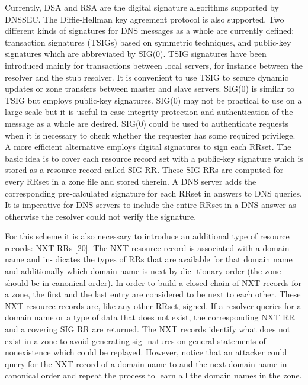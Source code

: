 \documentclass[12pt]{article}
\begin{document}
Currently, DSA and RSA are the digital signature
algorithms supported by DNSSEC. The Diffie-Hellman key
agreement protocol is also supported.
Two different kinds of signatures for DNS messages as a
whole are currently defined: transaction signatures (TSIGs) based on symmetric techniques, and public-key signatures which are abbreviated by SIG(0). TSIG signatures have been introduced mainly for transactions between
local servers, for instance between the resolver and the stub
resolver. It is convenient to use TSIG to secure dynamic
updates or zone transfers between master and slave servers.
SIG(0) is similar to TSIG but employs public-key signatures.
SIG(0) may not be practical to use on a large scale but it
is useful in case integrity protection and authentication of
the message as a whole are desired. SIG(0) could be used to
authenticate requests when it is necessary to check whether
the requester has some required privilege.
A more efficient alternative employs digital signatures to
sign each RRset. The basic idea is to
cover each resource record set with a public-key signature
which is stored as a resource record called SIG RR.
These SIG RRs are computed for every RRset in a zone file
and stored therein. A DNS server adds the corresponding
pre-calculated signature for each RRset in answers to DNS
queries. It is imperative for DNS servers to include the entire
RRset in a DNS answer as otherwise the resolver could not
verify the signature.

For this scheme it is also necessary to introduce an additional type of resource records: NXT RRs [20]. The NXT
resource record is associated with a domain name and in-
dicates the types of RRs that are available for that domain
name and additionally which domain name is next by dic-
tionary order (the zone should be in canonical order). In
order to build a closed chain of NXT records for a zone,
the first and the last entry are considered to be next to
each other. These NXT resource records are, like any other
RRset, signed. If a resolver queries for a domain name or
a type of data that does not exist, the corresponding NXT
RR and a covering SIG RR are returned. The NXT records
identify what does not exist in a zone to avoid generating sig-
natures on general statements of nonexistence which could
be replayed. However, notice that an attacker could query
for the NXT record of a domain name to and the next domain name in canonical order and repeat the process to learn
all the domain names in the zone.
\end{document}
